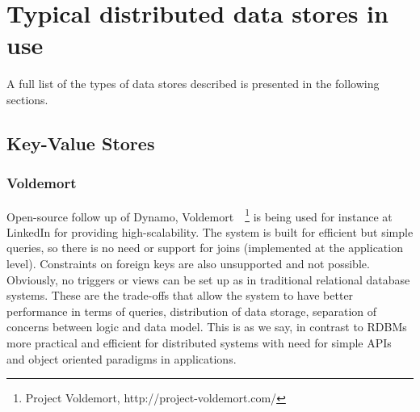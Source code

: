 		
	
		



\section{Typical distributed data stores in use} %
A full list of the types of data stores described is presented in the following sections.

\subsection{Key-Value Stores}

	\subsubsection{Voldemort}
	Open-source follow up of Dynamo, Voldemort~\cite{Sumbaly:2012}~\footnote{Project Voldemort, http://project-voldemort.com/} is being used for instance at LinkedIn for providing high-scalability. The system is built for efficient but simple queries, so there is no need or support for joins (implemented at the application level). Constraints on foreign keys are also unsupported and not possible. Obviously, no triggers or views can be set up as in traditional relational database systems. These are the trade-offs that allow the system to have better performance in terms of queries, distribution of data storage, separation of concerns between logic and data model. This is as we say, in contrast to RDBMs more practical and efficient for distributed systems with need for simple APIs and object oriented paradigms in applications.
	
